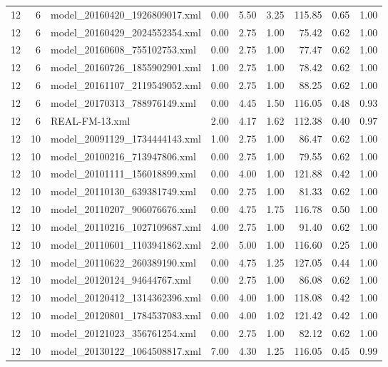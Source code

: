 \begin{table}[ht]
\begin{tabular}{rrlrrrrrr}
   12 &   6 & model\_20160420\_1926809017.xml & 0.00 & 5.50 & 3.25 & 115.85 & 0.65 & 1.00 \\ 
   12 &   6 & model\_20160429\_2024552354.xml & 0.00 & 2.75 & 1.00 & 75.42 & 0.62 & 1.00 \\ 
   12 &   6 & model\_20160608\_755102753.xml & 0.00 & 2.75 & 1.00 & 77.47 & 0.62 & 1.00 \\ 
   12 &   6 & model\_20160726\_1855902901.xml & 1.00 & 2.75 & 1.00 & 78.42 & 0.62 & 1.00 \\ 
   12 &   6 & model\_20161107\_2119549052.xml & 0.00 & 2.75 & 1.00 & 88.25 & 0.62 & 1.00 \\ 
   12 &   6 & model\_20170313\_788976149.xml & 0.00 & 4.45 & 1.50 & 116.05 & 0.48 & 0.93 \\ 
   12 &   6 & REAL-FM-13.xml & 2.00 & 4.17 & 1.62 & 112.38 & 0.40 & 0.97 \\ 
   12 &  10 & model\_20091129\_1734444143.xml & 1.00 & 2.75 & 1.00 & 86.47 & 0.62 & 1.00 \\ 
   12 &  10 & model\_20100216\_713947806.xml & 0.00 & 2.75 & 1.00 & 79.55 & 0.62 & 1.00 \\ 
   12 &  10 & model\_20101111\_156018899.xml & 0.00 & 4.00 & 1.00 & 121.88 & 0.42 & 1.00 \\ 
   12 &  10 & model\_20110130\_639381749.xml & 0.00 & 2.75 & 1.00 & 81.33 & 0.62 & 1.00 \\ 
   12 &  10 & model\_20110207\_906076676.xml & 0.00 & 4.75 & 1.75 & 116.78 & 0.50 & 1.00 \\ 
   12 &  10 & model\_20110216\_1027109687.xml & 4.00 & 2.75 & 1.00 & 91.40 & 0.62 & 1.00 \\ 
   12 &  10 & model\_20110601\_1103941862.xml & 2.00 & 5.00 & 1.00 & 116.60 & 0.25 & 1.00 \\ 
   12 &  10 & model\_20110622\_260389190.xml & 0.00 & 4.75 & 1.25 & 127.05 & 0.44 & 1.00 \\ 
   12 &  10 & model\_20120124\_94644767.xml & 0.00 & 2.75 & 1.00 & 86.08 & 0.62 & 1.00 \\ 
   12 &  10 & model\_20120412\_1314362396.xml & 0.00 & 4.00 & 1.00 & 118.08 & 0.42 & 1.00 \\ 
   12 &  10 & model\_20120801\_1784537083.xml & 0.00 & 4.00 & 1.02 & 121.42 & 0.42 & 1.00 \\ 
   12 &  10 & model\_20121023\_356761254.xml & 0.00 & 2.75 & 1.00 & 82.12 & 0.62 & 1.00 \\ 
   12 &  10 & model\_20130122\_1064508817.xml & 7.00 & 4.30 & 1.25 & 116.05 & 0.45 & 0.99 \\ 

\end{tabular}
\end{table}
